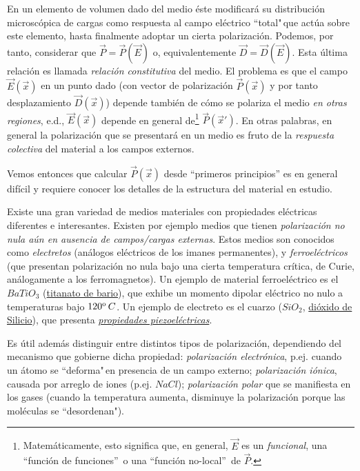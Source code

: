 En un elemento de volumen dado del medio éste modificará su distribución microscópica de cargas como respuesta al campo eléctrico ``total"\,que actúa sobre este elemento, hasta finalmente adoptar un cierta polarización. Podemos, por tanto, considerar que $\vec{P}=\vec{P}(\vec{E})$ o, equivalentemente
$\vec{D}=\vec{D}(\vec{E})$. Esta última relación es llamada
\textit{relación constitutiva} del medio. El problema es que el campo
$\vec{E}(\vec{x})$ en un punto dado (con vector de polarización $\vec{P}(\vec{x})$ y
por tanto desplazamiento $\vec{D}(\vec{x})$) depende también de cómo se
polariza el medio \textit{en otras regiones}, e.d., $\vec{E}(\vec{x})$ depende
en general de\footnote{Matemáticamente, esto significa que, en
general, $\vec{E}$ es un \textit{funcional}, una ``función de funciones''\, o
una ``función no-local''\, de $\vec{P}$.} $\vec{P}(\vec{x}')$.
En otras palabras, en general la polarización que se presentará en un medio es fruto de la  \textit{respuesta colectiva} del material a los campos externos.

 Vemos entonces que calcular $\vec{P}(\vec{x})$ desde ``primeros principios'' es en general difícil y requiere conocer los detalles de la estructura del material en estudio.

Existe una gran variedad de medios materiales con propiedades eléctricas
diferentes e interesantes. Existen por ejemplo medios que tienen \textit{polarización
no nula aún en ausencia de campos/cargas externas}. Estos medios son conocidos
como \textit{electretos} (análogos eléctricos de los imanes permanentes), y 
\textit{ferroeléctricos} (que presentan polarización no nula bajo una cierta
temperatura crítica, de Curie, análogamente a los ferromagnetos). Un ejemplo
de material ferroeléctrico es el $BaTiO_3$ (\href{https://en.wikipedia.org/wiki/Barium_titanate}{titanato de bario}), que exhibe un momento dipolar eléctrico no nulo a temperaturas bajo $120^{\rm o}\,C$. Un ejemplo de electreto es el cuarzo ($SiO_2$, \href{https://en.wikipedia.org/wiki/Silicon_dioxide}{dióxido de Silicio}), que presenta \href{https://es.wikipedia.org/wiki/Piezoelectricidad}{\textit{propiedades piezoeléctricas}}.

Es útil además distinguir entre distintos tipos de polarización, dependiendo del mecanismo que gobierne dicha propiedad: \textit{polarización electrónica}, p.ej. cuando un átomo se ``deforma"\,en presencia de un campo externo; \textit{polarización iónica}, causada por arreglo de iones (p.ej. $NaCl$); \textit{polarización polar} que se manifiesta en los gases (cuando la
temperatura aumenta, disminuye la polarización porque las moléculas se
``desordenan").

